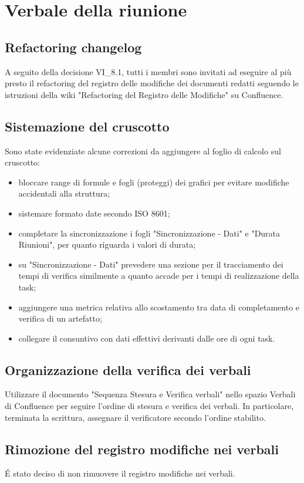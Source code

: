 \section{Verbale della riunione}
\subsection{Refactoring changelog}
A seguito della decisione VI\_8.1, tutti i membri sono invitati ad eseguire al più presto il refactoring del registro delle modifiche dei documenti redatti seguendo le istruzioni della wiki "Refactoring del Registro delle Modifiche" su Confluence.

\subsection{Sistemazione del cruscotto}
Sono state evidenziate alcune correzioni da aggiungere al foglio di calcolo sul cruscotto:
\begin{itemize}
	\item bloccare range di formule e fogli (proteggi) dei grafici per evitare modifiche accidentali alla struttura;
	\item sistemare formato date secondo ISO 8601;
	\item completare la sincronizzazione i fogli "Sincronizzazione - Dati" e "Durata Riunioni", per quanto riguarda i valori di durata;
	\item su "Sincronizzazione - Dati" prevedere una sezione per il tracciamento dei tempi di verifica similmente a quanto accade per i tempi di realizzazione della task;
	\item aggiungere una metrica relativa allo scostamento tra data di completamento e verifica di un artefatto;
	\item collegare il consuntivo con dati effettivi derivanti dalle ore di ogni task.
\end{itemize}

\subsection{Organizzazione della verifica dei verbali}
Utilizzare il documento "Sequenza Stesura e Verifica verbali" nello spazio Verbali di Confluence per seguire l'ordine di stesura e verifica dei verbali. In particolare, terminata la scrittura, assegnare il verificatore secondo l'ordine stabilito.


\subsection{Rimozione del registro modifiche nei verbali}
\'E stato deciso di non rimuovere il registro modifiche nei verbali.

